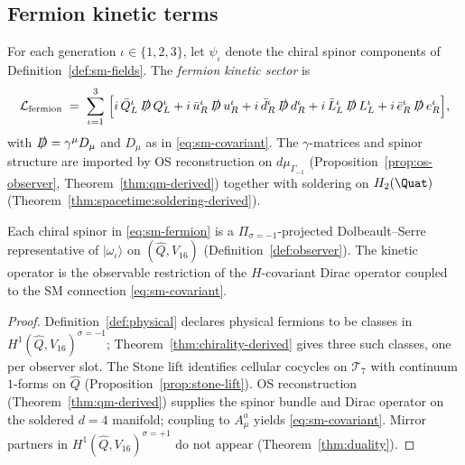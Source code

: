 \subsection{Fermion kinetic terms}
\label{sec:sm-lagrangian:fermion}

\begin{definition}\label{def:sm-fermion}
For each generation $\iota\in\{1,2,3\}$, let $\psi_{\iota}$ denote the chiral
spinor components of Definition~\ref{def:sm-fields}. The \emph{fermion kinetic
sector} is
\begin{equation}\label{eq:sm-fermion}
  \mathcal{L}_{\mathrm{fermion}}
  \;=\;
  \sum_{\iota=1}^{3}\;
  \Bigl[
    i\,\bar Q_L^\iota\,\slashed{D}\,Q_L^\iota
    + i\,\bar u_R^\iota\,\slashed{D}\,u_R^\iota
    + i\,\bar d_R^\iota\,\slashed{D}\,d_R^\iota
    + i\,\bar L_L^\iota\,\slashed{D}\,L_L^\iota
    + i\,\bar e_R^\iota\,\slashed{D}\,e_R^\iota
  \Bigr],
\end{equation}
with $\slashed{D}=\gamma^\mu D_\mu$ and $D_\mu$ as in \eqref{eq:sm-covariant}.
The $\gamma$-matrices and spinor structure are imported by OS reconstruction on
$d\mu_{\Gamma_{-1}}$ (Proposition~\ref{prop:os-observer}, Theorem~\ref{thm:qm-derived})
together with soldering on $H_2(\Quat)$
(Theorem~\ref{thm:spacetime:soldering-derived}).
\end{definition}

\begin{lemma}[Fermion kinetic terms from $H^1(\hat Q,V_{16})^{\sigma=-1}$]
\label{lem:sm-fermion-derived}
Each chiral spinor in \eqref{eq:sm-fermion} is a $\Pi_{\sigma=-1}$-projected
Dolbeault--Serre representative of $|\omega_\iota\rangle$ on
$(\hat Q,V_{16})$ (Definition~\ref{def:observer}). The kinetic operator is the
observable restriction of the $H$-covariant Dirac operator coupled to the SM
connection \eqref{eq:sm-covariant}.
\end{lemma}

\begin{proof}
Definition~\ref{def:physical} declares physical fermions to be classes in
$H^1(\hat Q,V_{16})^{\sigma=-1}$; Theorem~\ref{thm:chirality-derived} gives
three such classes, one per observer slot. The Stone lift identifies cellular
cocycles on $\mathcal{T}_7$ with continuum $1$-forms on $\hat Q$
(Proposition~\ref{prop:stone-lift}). OS reconstruction
(Theorem~\ref{thm:qm-derived}) supplies the spinor bundle and Dirac operator on
the soldered $d=4$ manifold; coupling to $A_\mu^a$ yields \eqref{eq:sm-covariant}.
Mirror partners in $H^1(\hat Q,V_{16})^{\sigma=+1}$ do not appear
(Theorem~\ref{thm:duality}).
\end{proof}

